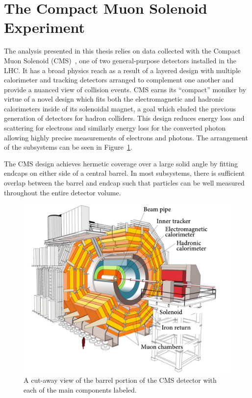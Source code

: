 \section{The Compact Muon Solenoid Experiment}
The analysis presented in this thesis relies on data collected with the Compact Muon Solenoid (CMS)~\cite{CMSPaper}, one of two general-purpose detectors installed in the LHC.  It has a broad physics reach as a result of a layered design with multiple calorimeter and tracking detectors arranged to complement one another and provide a nuanced view of collision events.  CMS earns its ``compact'' moniker by virtue of a novel design which fits both the electromagnetic and hadronic calorimeters inside of its solenoidal magnet, a goal which eluded the previous generation of detectors for hadron colliders. 
This design reduces energy loss and scattering for electrons and similarly energy loss for the converted photon allowing highly precise measurements of electrons and photons.
The arrangement of the subsystems can be seen in Figure~\ref{fig:cms-cutaway}.

The CMS design achieves hermetic coverage over a large solid angle by fitting endcaps on either side of a central barrel.  In most subsystems, there is sufficient overlap between the barrel and endcap such that particles can be well measured throughout the entire detector volume.

\begin{figure}[htbp]
\centering
\includegraphics[width=4.5in]{figures/cms-cutaway.pdf}
\caption{A cut-away view of the barrel portion of the CMS detector with each of the main components labeled.}
\label{fig:cms-cutaway}
\end{figure}

